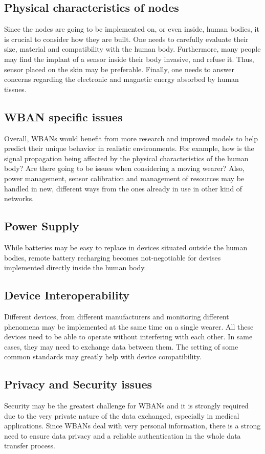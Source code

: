 \documentclass[conference]{IEEEtran}
\begin{document}
\subsection {Physical characteristics of nodes}
Since the nodes are going to be implemented on, or even inside, human bodies, it is crucial to consider how they are built. One needs to carefully evaluate their size, material and compatibility with the human body. Furthermore, many people may find the implant of a sensor inside their body invasive, and refuse it. Thus, sensor placed on the skin may be preferable. Finally, one needs to answer concerns regarding the electronic and magnetic energy absorbed by human tissues.

\subsection {WBAN specific issues}
Overall, WBANs would benefit from more research and improved models to help predict their unique behavior in realistic environments. For example, how is the signal propagation being affected by the physical characteristics of the human body? Are there going to be issues when considering a moving wearer? Also, power management, sensor calibration and management of resources may be handled in new, different ways from the ones already in use in other kind of networks.

\subsection {Power Supply}
While batteries may be easy to replace in devices situated outside the human bodies, remote battery recharging becomes not-negotiable for devises implemented directly inside the human body.

\subsection {Device Interoperability}
Different devices, from different manufacturers and monitoring different phenomena may be implemented at the same time on a single wearer. All these devices need to be able to operate without interfering with each other. In same cases, they may need to exchange data between them. The setting of some common standards may greatly help with device compatibility. 

\subsection {Privacy and Security issues}
Security may be the greatest challenge for WBANs and it is strongly required due to the very private nature of the data exchanged, especially in medical applications. Since WBANs deal with very personal information, there is a strong need to ensure data privacy and a reliable authentication in the whole data transfer process. 
\end{document}
